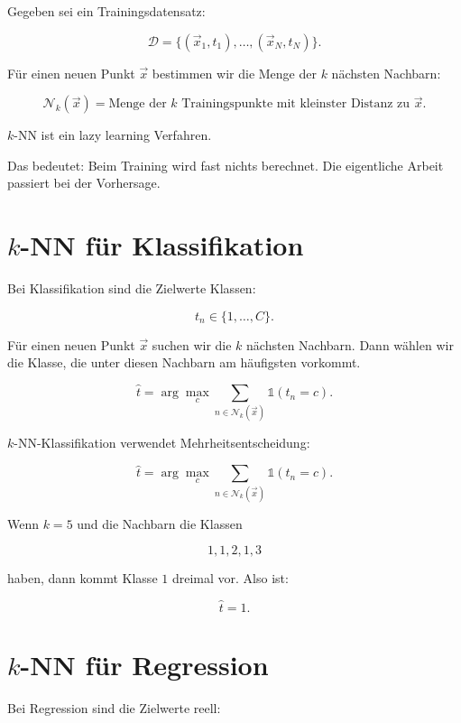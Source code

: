 Gegeben sei ein Trainingsdatensatz:

\[
    \mathcal{D}
    =
    \{(\vec{x}_1,t_1),\dots,(\vec{x}_N,t_N)\}.
\]

Für einen neuen Punkt \(\vec{x}\) bestimmen wir die Menge der \(k\) nächsten Nachbarn:

\[
    \mathcal{N}_k(\vec{x})
    =
    \text{Menge der } k \text{ Trainingspunkte mit kleinster Distanz zu } \vec{x}.
\]

\begin{notebox}
\(k\)-NN ist ein lazy learning Verfahren.

Das bedeutet:
Beim Training wird fast nichts berechnet.
Die eigentliche Arbeit passiert bei der Vorhersage.
\end{notebox}

\section{\(k\)-NN für Klassifikation}

Bei Klassifikation sind die Zielwerte Klassen:

\[
    t_n\in\{1,\dots,C\}.
\]

Für einen neuen Punkt \(\vec{x}\) suchen wir die \(k\) nächsten Nachbarn.
Dann wählen wir die Klasse, die unter diesen Nachbarn am häufigsten vorkommt.

\[
    \hat{t}
    =
    \arg\max_{c}
    \sum_{n\in\mathcal{N}_k(\vec{x})}
    \mathbb{1}(t_n=c).
\]

\begin{definitionbox}
\(k\)-NN-Klassifikation verwendet Mehrheitsentscheidung:

\[
    \hat{t}
    =
    \arg\max_{c}
    \sum_{n\in\mathcal{N}_k(\vec{x})}
    \mathbb{1}(t_n=c).
\]
\end{definitionbox}

\begin{examplebox}
Wenn \(k=5\) und die Nachbarn die Klassen

\[
    1,1,2,1,3
\]

haben, dann kommt Klasse \(1\) dreimal vor.
Also ist:

\[
    \hat{t}=1.
\]
\end{examplebox}

\section{\(k\)-NN für Regression}

Bei Regression sind die Zielwerte reell:


